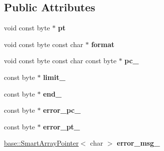 \subsection*{Public Attributes}
\begin{DoxyCompactItemize}
\item 
void const byte $\ast$ {\bfseries pt}\hypertarget{classv8_1_1internal_1_1wasm_1_1_decoder_a89427dbc7b3c6cdcab4170ae1e0c0c1d}{}\label{classv8_1_1internal_1_1wasm_1_1_decoder_a89427dbc7b3c6cdcab4170ae1e0c0c1d}

\item 
void const byte const char $\ast$ {\bfseries format}\hypertarget{classv8_1_1internal_1_1wasm_1_1_decoder_a8621fa95a0132e4681f8da5493370ee9}{}\label{classv8_1_1internal_1_1wasm_1_1_decoder_a8621fa95a0132e4681f8da5493370ee9}

\item 
void const byte const char const byte $\ast$ {\bfseries pc\+\_\+}\hypertarget{classv8_1_1internal_1_1wasm_1_1_decoder_ac33a81a943512e2fda98670a4c4cdbb4}{}\label{classv8_1_1internal_1_1wasm_1_1_decoder_ac33a81a943512e2fda98670a4c4cdbb4}

\item 
const byte $\ast$ {\bfseries limit\+\_\+}\hypertarget{classv8_1_1internal_1_1wasm_1_1_decoder_ad9703f8a7079f9a2cdb3f5440122bfd0}{}\label{classv8_1_1internal_1_1wasm_1_1_decoder_ad9703f8a7079f9a2cdb3f5440122bfd0}

\item 
const byte $\ast$ {\bfseries end\+\_\+}\hypertarget{classv8_1_1internal_1_1wasm_1_1_decoder_a091e7b1a0913396a619891eb692ece17}{}\label{classv8_1_1internal_1_1wasm_1_1_decoder_a091e7b1a0913396a619891eb692ece17}

\item 
const byte $\ast$ {\bfseries error\+\_\+pc\+\_\+}\hypertarget{classv8_1_1internal_1_1wasm_1_1_decoder_a2fd122b98f63729ef2b65e246bfb3af4}{}\label{classv8_1_1internal_1_1wasm_1_1_decoder_a2fd122b98f63729ef2b65e246bfb3af4}

\item 
const byte $\ast$ {\bfseries error\+\_\+pt\+\_\+}\hypertarget{classv8_1_1internal_1_1wasm_1_1_decoder_a860341f02dbaaaa54f1db083120c3c7a}{}\label{classv8_1_1internal_1_1wasm_1_1_decoder_a860341f02dbaaaa54f1db083120c3c7a}

\item 
\hyperlink{classv8_1_1base_1_1_smart_array_pointer}{base\+::\+Smart\+Array\+Pointer}$<$ char $>$ {\bfseries error\+\_\+msg\+\_\+}\hypertarget{classv8_1_1internal_1_1wasm_1_1_decoder_a7e2e98a37aea6986f673668bfb7403bb}{}\label{classv8_1_1internal_1_1wasm_1_1_decoder_a7e2e98a37aea6986f673668bfb7403bb}

\end{DoxyCompactItemize}

